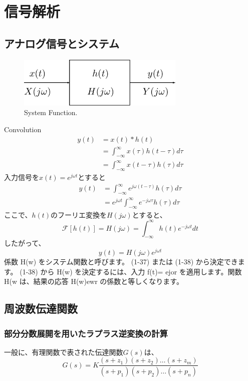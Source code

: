 \documentclass[book]{jlreq}
\begin{document}
\appendix
\chapter{信号解析}
\section{アナログ信号とシステム}
%
\begin{figure}[hbt]
    \begin{center}
        \includegraphics[width=8cm,clip]{figs/System_Func.pdf}
        \caption{System Function.}
        \label{fig:sys_func}
    \end{center}
\end{figure}
%
Convolution
%
\begin{align}
    y(t) & =x(t)\ast h(t)                                \\
         & =\int_{-\infty}^{\infty}x(\tau)h(t-\tau)d\tau \\
         & =\int_{-\infty}^{\infty}x(t-\tau)h(\tau)d\tau
\end{align}
%
入力信号を$x(t)=e^{j\omega t}$とすると
%
\begin{align}
    y(t) & = \int_{-\infty}^{\infty}e^{j\omega(t-\tau)}h(\tau)d\tau           \\
         & = e^{j\omega t}\int_{-\infty}^{\infty}e^{-j\omega\tau}h(\tau)d\tau
\end{align}
%
ここで、$h(t)$のフーリエ変換を$H(j\omega)$とすると、
%
\begin{equation}
    \mathcal{F}[h(t)] = H(j\omega) = \int_{-\infty}^{\infty}h(t)e^{-j\omega t}dt
\end{equation}
%
したがって、
%
\begin{equation}
    y(t) = H(j\omega)e^{j\omega t}
\end{equation}
%
係数 H(w) をシステム関数と呼びます。 (1-37) または (1-38) から決定できます。 (1-38) から H(w) を決定するには、入力 f(t)= ejor を適用します。関数 H(w は、結果の応答 H(w)ewr の係数と等しくなります。

\section{周波数伝達関数}
\subsection{部分分数展開を用いたラプラス逆変換の計算}
一般に、有理関数で表された伝達関数$G(s)$は、
%
\begin{equation}
    G(s)=K\frac{(s+z_1)(s+z_2)\dots(s+z_m)}{(s+p_1)(s+p_2)\dots(s+p_n)}
\end{equation}
%
\end{document}
